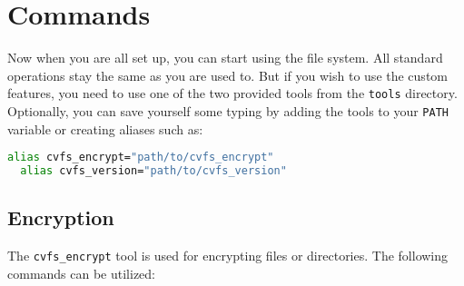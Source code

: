 \section*{Commands}

Now when you are all set up, you can start using the file system.
All standard operations stay the same as you are used to.
But if you wish to use the custom features, you need to use one of the two provided tools from the \texttt{tools} directory.
Optionally, you can save yourself some typing by adding the tools to your \texttt{PATH} variable or creating aliases such as:

\begin{lstlisting}[language=bash, basicstyle=\ttfamily\small]
  alias cvfs_encrypt="path/to/cvfs_encrypt"
  alias cvfs_version="path/to/cvfs_version"
\end{lstlisting}

\subsection*{Encryption}

The \texttt{cvfs\_encrypt} tool is used for encrypting files or directories.
The following commands can be utilized:

